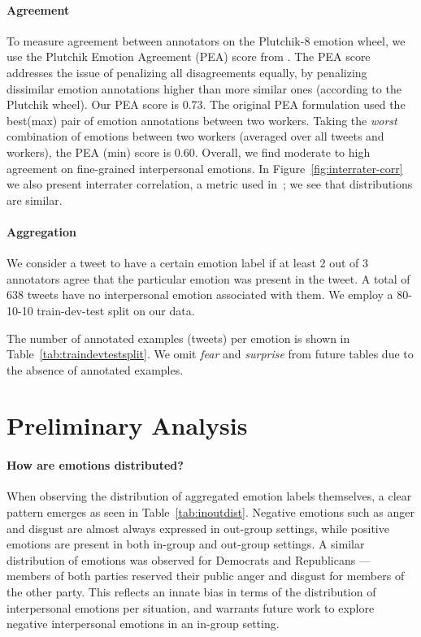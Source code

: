 \paragraph{Agreement}   To measure agreement between annotators on the Plutchik-8 emotion wheel, we use the Plutchik Emotion Agreement (PEA) score from \citet{desai-etal-2020-detecting}. The PEA score addresses the issue of penalizing all disagreements equally, by penalizing dissimilar emotion annotations higher than more similar ones (according to the Plutchik wheel). Our PEA score is 0.73. The original PEA formulation used the best(max) pair of emotion annotations between two workers. Taking the \emph{worst} combination of emotions between two workers (averaged over all tweets and workers), the PEA (min) score is 0.60. Overall, we find moderate to high agreement on fine-grained interpersonal emotions.  In Figure~\ref{fig:interrater-corr} we also present interrater correlation, a metric used in~\citet{demszky-etal-2020-goemotions}; we see that distributions are similar.



\paragraph{Aggregation} We consider a tweet to have a certain emotion label if at least 2 out of 3 annotators agree that the particular emotion was present in the tweet. A total of 638 tweets have no interpersonal emotion associated with them. We employ a 80-10-10 train-dev-test split on our data.

The number of annotated examples (tweets) per emotion is shown in Table~\ref{tab:traindevtestsplit}. We omit \emph{fear} and \emph{surprise} from future tables due to the absence of annotated examples.

\section{Preliminary Analysis}
\label{sec:twitter-prelim}

\paragraph{How are emotions distributed?} When observing the distribution of aggregated emotion labels themselves, a clear pattern emerges as seen in Table~\ref{tab:inoutdist}. Negative emotions such as anger and disgust are almost always expressed in out-group settings, while positive emotions are present in both in-group and out-group settings. A similar distribution of emotions was observed for Democrats and Republicans --- members of both parties reserved their public anger and disgust for members of the other party. This reflects an innate bias in terms of the distribution of interpersonal emotions per situation, and warrants future work to explore negative interpersonal emotions in an in-group setting.


